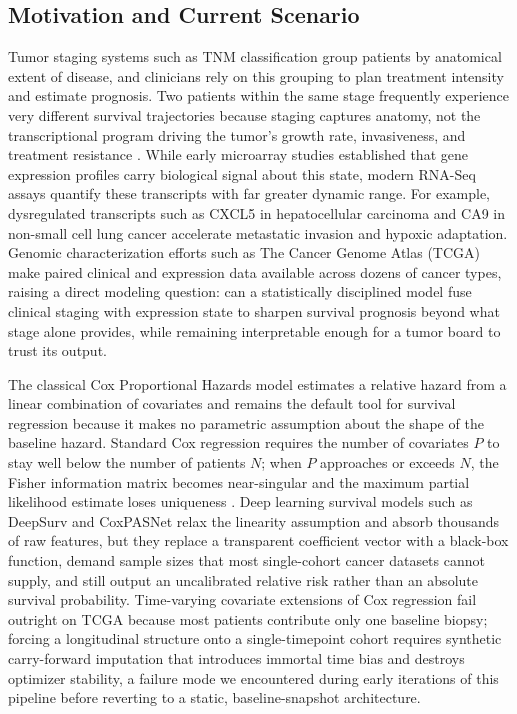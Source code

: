 \documentclass[sigconf, review=true]{acmart}
\begin{document}
\subsection{Motivation and Current Scenario}
Tumor staging systems such as TNM classification group patients by anatomical extent of disease, and clinicians rely on this grouping to plan treatment intensity and estimate prognosis. Two patients within the same stage frequently experience very different survival trajectories because staging captures anatomy, not the transcriptional program driving the tumor's growth rate, invasiveness, and treatment resistance \cite{vanhouwelingen2006crossvalidated}. While early microarray studies established that gene expression profiles carry biological signal about this state, modern RNA-Seq assays quantify these transcripts with far greater dynamic range. For example, dysregulated transcripts such as CXCL5 in hepatocellular carcinoma \cite{grunkin2011cxcl5} and CA9 in non-small cell lung cancer \cite{giatromanolaki2001ca9} accelerate metastatic invasion and hypoxic adaptation. Genomic characterization efforts such as The Cancer Genome Atlas (TCGA) \cite{weinstein2013cancer} make paired clinical and expression data available across dozens of cancer types, raising a direct modeling question: can a statistically disciplined model fuse clinical staging with expression state to sharpen survival prognosis beyond what stage alone provides, while remaining interpretable enough for a tumor board to trust its output.

The classical Cox Proportional Hazards model estimates a relative hazard from a linear combination of covariates and remains the default tool for survival regression because it makes no parametric assumption about the shape of the baseline hazard. Standard Cox regression requires the number of covariates $P$ to stay well below the number of patients $N$; when $P$ approaches or exceeds $N$, the Fisher information matrix becomes near-singular and the maximum partial likelihood estimate loses uniqueness \cite{tibshirani1997lasso}. Deep learning survival models such as DeepSurv \cite{katzman2018deepsurv} and CoxPASNet \cite{hao2018coxpasnet} relax the linearity assumption and absorb thousands of raw features, but they replace a transparent coefficient vector with a black-box function, demand sample sizes that most single-cohort cancer datasets cannot supply, and still output an uncalibrated relative risk rather than an absolute survival probability. Time-varying covariate extensions of Cox regression fail outright on TCGA because most patients contribute only one baseline biopsy; forcing a longitudinal structure onto a single-timepoint cohort requires synthetic carry-forward imputation that introduces immortal time bias and destroys optimizer stability, a failure mode we encountered during early iterations of this pipeline before reverting to a static, baseline-snapshot architecture.
\end{document}
